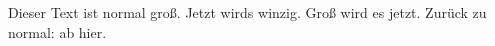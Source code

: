 Dieser Text ist normal groß. Jetzt wirds \tiny winzig. Groß wird es \huge jetzt. Zurück zu normal: \normalsize ab hier. 